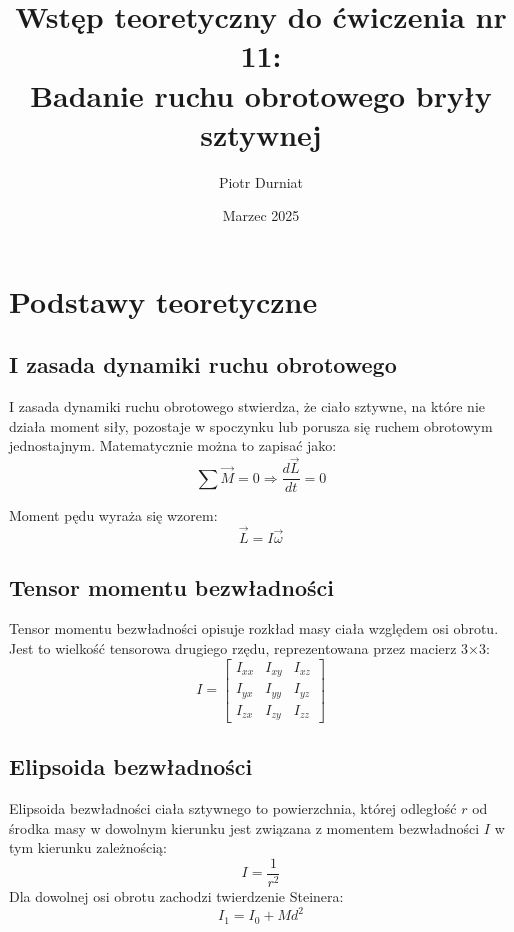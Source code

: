 \documentclass{article}
\title{Wstęp teoretyczny do ćwiczenia nr 11: \\
Badanie ruchu obrotowego bryły sztywnej}
\author{Piotr Durniat}
\date{Marzec 2025}
\begin{document}
\maketitle

\section{Podstawy teoretyczne}

\subsection{I zasada dynamiki ruchu obrotowego}
I zasada dynamiki ruchu obrotowego stwierdza, że ciało sztywne, na które nie działa moment siły, pozostaje w spoczynku lub porusza się ruchem obrotowym jednostajnym. Matematycznie można to zapisać jako:
\begin{equation}
    \sum \vec{M} = 0 \Rightarrow \frac{d\vec{L}}{dt} = 0
\end{equation}

Moment pędu wyraża się wzorem:
\begin{equation}
    \vec{L} = I \vec{\omega}
\end{equation}

\subsection{Tensor momentu bezwładności}
Tensor momentu bezwładności opisuje rozkład masy ciała względem osi obrotu. Jest to wielkość tensorowa drugiego rzędu, reprezentowana przez macierz 3×3:
\begin{equation}
    I = \begin{bmatrix} I_{xx} & I_{xy} & I_{xz} \\
                I_{yx} & I_{yy} & I_{yz} \\
                I_{zx} & I_{zy} & I_{zz}\end{bmatrix}
\end{equation}

\subsection{Elipsoida bezwładności}
Elipsoida bezwładności ciała sztywnego to powierzchnia, której odległość $r$ od środka masy w dowolnym kierunku jest związana z momentem bezwładności $I$ w tym kierunku zależnością:
\begin{equation}
    I = \frac{1}{r^2}
\end{equation}
Dla dowolnej osi obrotu zachodzi twierdzenie Steinera:
\begin{equation}
    I_1 = I_0 + M d^2
\end{equation}
\end{document}
